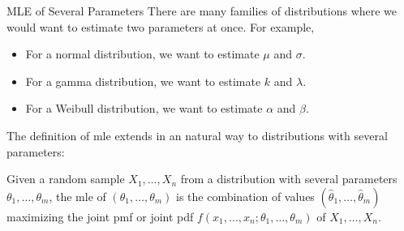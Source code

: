 \documentclass{beamer}
\begin{document}
\begin{frame}{MLE of Several Parameters}
There are many families of distributions where we would want to estimate two parameters at once. For example,
\begin{itemize}
\item For a normal distribution, we want to estimate $\mu$ and $\sigma$.
\item For a gamma distribution, we want to estimate $k$ and $\lambda$.
\item For a Weibull distribution, we want to estimate $\alpha$ and $\beta$.
\end{itemize}
\pause The definition of mle extends in an natural way to distributions with several parameters:
\pause \begin{block}{}
Given a random sample $X_1,\dots,X_n$ from a distribution with several parameters $\theta_1,\dots,\theta_m$, the mle of $(\theta_1,\dots,\theta_m)$ is the combination of values $(\hat\theta_1,\dots,\hat\theta_m)$ maximizing the joint pmf or joint pdf $f(x_1,\dots,x_n ; \theta_1,\dots,\theta_m)$ of $X_1,\dots,X_n$.
\end{block}
\end{frame}
\end{document}
